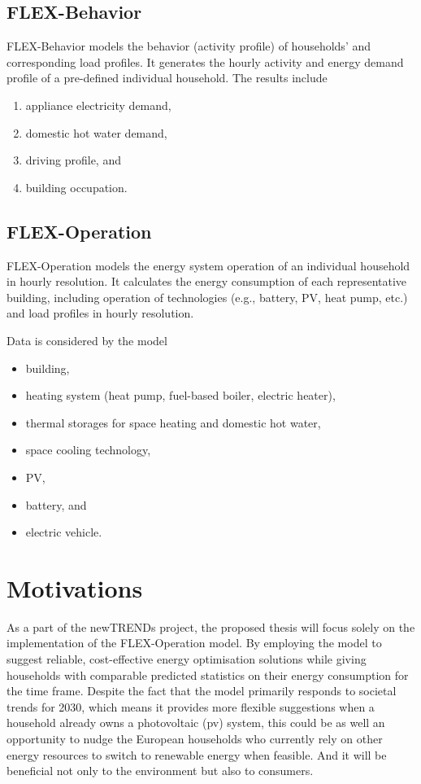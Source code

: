 \subsection{FLEX-Behavior}

FLEX-Behavior models the behavior (activity profile) of households' and corresponding load profiles. 
It generates the hourly activity and energy demand profile of a pre-defined individual household. 
The results include

\begin{enumerate}
  \item appliance electricity demand,
  \item domestic hot water demand,
  \item driving profile, and
  \item building occupation.
\end{enumerate}

\subsection{FLEX-Operation}

FLEX-Operation models the energy system operation of an individual household in hourly resolution.  
It calculates the energy consumption of each representative building, including operation of technologies (e.g., battery, PV, heat pump, etc.) and load profiles in hourly resolution.

Data is considered by the model

\begin{itemize}
  \item building,
  \item heating system (heat pump, fuel-based boiler, electric heater),
  \item thermal storages for space heating and domestic hot water,
  \item space cooling technology,
  \item PV,
  \item battery, and
  \item electric vehicle.
\end{itemize}

\section{Motivations}

As a part of the newTRENDs project, 
the proposed thesis will focus solely on the implementation of the FLEX-Operation model.  
By employing the model to 
suggest reliable, cost-effective energy optimisation solutions 
while giving households with comparable predicted statistics on their energy consumption for the time frame. 
Despite the fact that the model primarily responds to societal trends for 2030, 
which means it provides more flexible suggestions when a household already owns a photovoltaic (\gls{pv}) system, 
this could be as well an opportunity to nudge the European households who currently rely on other energy resources
to switch to renewable energy when feasible. 
And it will be beneficial not only to the environment but also to consumers. 

